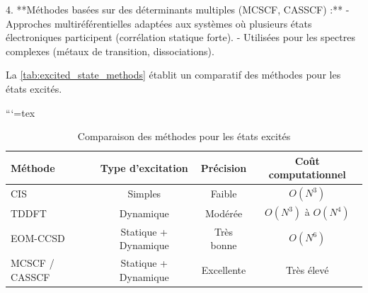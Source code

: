 \documentclass[12pt,a4paper]{report}
\begin{document}
\begin{markdown}
4. **Méthodes basées sur des déterminants multiples (MCSCF, CASSCF) :**
   - Approches multiréférentielles adaptées aux systèmes où plusieurs états électroniques participent (corrélation statique forte).
   - Utilisées pour les spectres complexes (métaux de transition, dissociations).

La \autoref{tab:excited_state_methods} établit un comparatif des méthodes pour les états excités.

```{=tex}
\begin{table}[h!]
\centering
\caption{Comparaison des méthodes pour les états excités}
\begin{tabular}{@{}lccc@{}}
\toprule
\textbf{Méthode}         & \textbf{Type d’excitation}   & \textbf{Précision}   & \textbf{Coût computationnel} \\ \midrule
CIS                      & Simples                     & Faible               & $O(N^3)$                     \\
TDDFT                    & Dynamique                   & Modérée              & $O(N^3)$ à $O(N^4)$          \\
EOM-CCSD                 & Statique + Dynamique        & Très bonne           & $O(N^6)$                     \\
MCSCF / CASSCF           & Statique + Dynamique        & Excellente           & Très élevé                    \\ \bottomrule
\end{tabular}
\label{tab:excited_state_methods}
\end{table}




\end{markdown}
\end{document}
